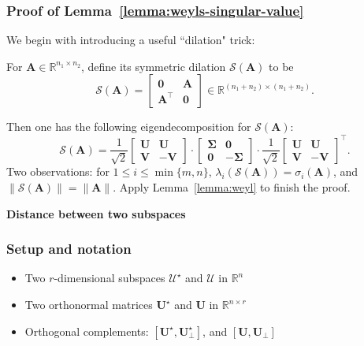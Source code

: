 \documentclass[compress,
mathserif,wide,%
]{beamer}
\begin{document}
\begin{frame}
	\frametitle{Proof of Lemma~\ref{lemma:weyls-singular-value}}
We begin with introducing a useful ``dilation" trick: 
	\begin{definition}
\label{defn:sym-dilation}
For $\bm{A}\in\mathbb{R}^{n_{1}\times n_{2}}$, define its symmetric dilation $\mathcal{S}(\bm{A})$ to be 
%
\[
\mathcal{S}(\bm{A})=\left[\begin{array}{cc}
\bm{0} & \bm{A}\\
\bm{A}^{\top} & \bm{0}
\end{array}\right] \in \mathbb{R}^{(n_1 + n_2) \times (n_1 + n_2)}.
\]
%
 \end{definition}
 
 
 Then one has the following eigendecomposition
for $\mathcal{S}(\bm{A})$: 
\begin{equation*}
\mathcal{S}(\bm{A})=\frac{1}{\sqrt{2}}\left[\begin{array}{cc}
\bm{U} & \bm{U}\\
\bm{V} & -\bm{V}
\end{array}\right]\cdot\left[\begin{array}{cc}
\bm{\Sigma} & \bm{0}\\
\bm{0} & -\bm{\Sigma}
\end{array}\right]\cdot\frac{1}{\sqrt{2}}\left[\begin{array}{cc}
\bm{U} & \bm{U}\\
\bm{V} & -\bm{V}
\end{array}\right]^{\top}.
\end{equation*}
Two observations: for $1\leq i\leq \min\{m,n\}$, $\lambda_{i}(\mathcal{S}(\bm{A})) = \sigma_{i}(\bm{A})$, and $\|\mathcal{S}(\bm{A})\| = \|\bm{A}\|$. Apply Lemma~\ref{lemma:weyl} to finish the proof.
\end{frame}



\begin{frame}[plain]

\vfill
\begin{center}
  {\Large\bf Distance between two subspaces}
\end{center}
\vfill

\end{frame}

\begin{frame}
	\frametitle{Setup and notation}
	\begin{itemize}
		\item Two $r$-dimensional subspaces $\mathcal{U}^{\star}$ and $\mathcal{U}$ in $\mathbb{R}^{n}$
		\item Two orthonormal matrices $\bm{U}^{\star}$ and $\bm{U}$ in $\mathbb{R}^{n \times r}$
		\item Orthogonal complements: $[\bm{U}^\star, \bm{U}^\star_{\perp}]$, and $[\bm{U}, \bm{U}_{\perp}]$
	\end{itemize}
\end{frame}
\end{document}
